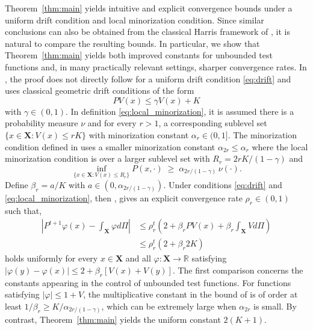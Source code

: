 \documentclass[ejsv2, noshowframe]{imsart}
\theoremstyle{plain}
\theoremstyle{definition}
\theoremstyle{remark}
\newcommand{\R}{\mathbb{R}}
\renewcommand{\P}{P}
\newcommand{\X}{\textbf{X}}
\let\temp\phi
\let\phi\varphi
\let\varphi\temp
\begin{document}


\noindent
Theorem~\ref{thm:main} yields intuitive and explicit convergence bounds under a uniform drift condition and local minorization condition. Since similar conclusions can also be obtained from the classical Harris framework of \cite{hairer:mattingly:2011}, it is natural to compare the resulting bounds. 
In particular, we show that Theorem~\ref{thm:main} yields both improved constants for unbounded test functions and, in many practically relevant settings, sharper convergence rates. 
In \citep{hairer:mattingly:2011}, the proof does not directly follow for a uniform drift condition \eqref{eq:drift} and uses classical geometric drift conditions of the form
\[
\P V(x) \le \gamma V(x) + K
\]
with $\gamma \in (0, 1)$.
In definition \eqref{eq:local_minorization}, it is assumed there is a probability measure $\nu$ and for every $r > 1$, a corresponding sublevel set $\{x \in \X : V(x) \le r K\}$ with minorization constant $\alpha_r \in (0, 1]$.
The minorization condition defined in \citep{hairer:mattingly:2011} uses a smaller minorization constant $\alpha_{2r} \le \alpha_{r}$ where the local minorization condition is over a larger sublevel set with $R_r  = 2 r K / (1 - \gamma)$ and
\[
\inf_{\{x \in \X : V(x) \le R_r \}} P(x, \cdot) \;\ge\; \alpha_{2r/(1-\gamma)} \, \nu(\cdot).
\]
Define $\beta_r = a / K$ with $a \in (0, \alpha_{2r/(1-\gamma)})$.
Under conditions \eqref{eq:drift} and \eqref{eq:local_minorization}, then \citep[Theorem 1.3]{hairer:mattingly:2011}, gives an explicit convergence rate $\rho_r \in (0, 1)$ such that,
\begin{align*}
\left|
\P^{t + 1} \phi(x) - \int_{\X} \phi d\Pi
\right|
&\le \rho_r^t \left( 2 + \beta_r PV(x) + \beta_r \int_{\X} V d\Pi \right)
\\
&\le \rho_r^t \left( 2 + \beta_r 2K \right)
\end{align*}
holds uniformly for every $x \in \X$ and all $\phi : \X \to \R$ satisfying $| \phi(y) - \phi(x) | \le 2 + \beta_r [ V(x) + V(y) ]$.
The first comparison concerns the constants appearing in the control of unbounded test functions. For functions satisfying $|\phi| \le 1 + V$, the multiplicative constant in the bound of \cite[Theorem~1.3]{hairer:mattingly:2011} is of order at least $1/\beta_r \ge K /  \alpha_{2r/(1-\gamma)}$, which can be extremely large when $\alpha_{2r}$ is small. By contrast, Theorem~\ref{thm:main} yields the uniform constant $2(K+1)$.
\end{document}
